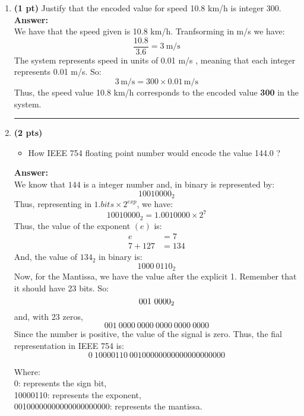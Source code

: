 \documentclass[a4paper,10pt]{article}
\begin{document}
\begin{enumerate}[label=\textbf{Question \arabic*.}]
    \item \textbf{(1 pt)} Justify that the encoded value for speed 10.8 km/h is integer 300.\\
    
    \textbf{Answer:} \\
    We have that the speed given is 10.8 km/h. Tranfsorming in m/s we have:\\
    \[ \frac{10.8}{3.6} = 3 \ \text{m/s} \]
    The system represents speed in units of  0.01 m/s , meaning that each integer represents 0.01 m/s. So: 
    \[ 3 \, \text{m/s} = 300 \times 0.01 \, \text{m/s} \]
    Thus, the speed value 10.8 km/h corresponds to the encoded value \textbf{300} in the system.
    
    \noindent\rule{\textwidth}{0.4mm} 
    
    \item \textbf{(2 pts)}
    \begin{itemize}
        \item How IEEE 754 floating point number would encode the value 144.0 ?
    \end{itemize}
        \textbf{Answer:} \\
        We know that $144$ is a integer number and, in binary is represented by:
        \[ 10010000_2 \]
        Thus, representing in $1.bits\times2^{exp}$, we have:
        \[ 10010000_2 = 1.0010000\times2^7 \]
        Thus, the value of the exponent $(e)$ is:
        \begin{align*}
            e &= 7 \\
            7 + 127 &= 134
        \end{align*}
        And, the value of $134_2$ in binary is:
        \[ 1000\ 0110_2 \]
        Now, for the Mantissa, we have the value after the explicit 1. Remember that it should have 23 bits. So:
        \[ 001\ 0000_2 \\\]
        and, with 23 zeros,
        \[ 001\ 0000\ 0000\ 0000\ 0000\ 0000\]
        Since the number is positive, the value of the signal is zero.
        Thus, the fial representation in IEEE 754 is:
        \[ 0\ 10000110\ 00100000000000000000000 \]
        \parbox{\textwidth}{
            \small
            Where: \\
            0: represents the sign bit, \\
            10000110: represents the exponent, \\
            00100000000000000000000: represents the mantissa.
        } \\


\end{enumerate}
\end{document}
